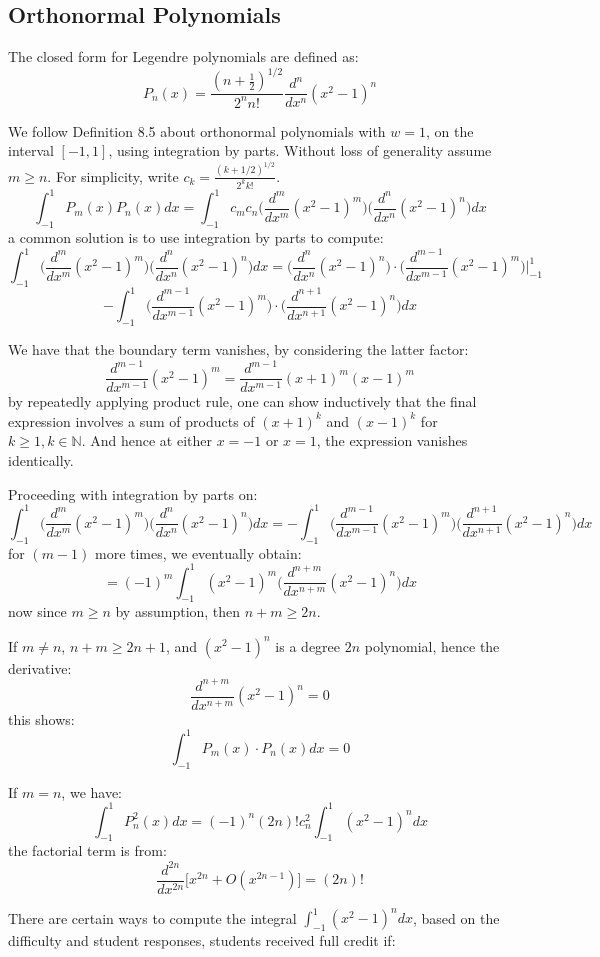 \documentclass[12pt]{article} %
\newcommand{\nn}{\mathbb{N}}
\newcommand{\1}[1]{\mathds{1}\left[#1\right]}
\begin{document}
\newpage
\subsection{Orthonormal Polynomials}
The closed form for Legendre polynomials are defined as:
$$
	P_n(x) = \frac{(n+\frac12)^{1/2}}{2^nn!}\frac{d^n}{dx^n}(x^2-1)^n
$$

We follow Definition 8.5 about orthonormal polynomials with $w = 1$, on the interval $[-1,1]$, using integration by parts. Without loss of generality assume $m\ge n$. For simplicity, write $c_k = \frac{(k+1/2)^{1/2}}{2^kk!}$.
$$
	\int_{-1}^1P_m(x)P_n(x)dx = \int_{-1}^1 c_mc_n\bigg(\frac{d^m}{dx^m}(x^2-1)^m\bigg)\bigg(\frac{d^n}{dx^n}(x^2-1)^n\bigg)dx
$$ a common solution is to use integration by parts to compute:
$$
	\int_{-1}^1\bigg(
	\frac{d^m}{dx^m}(x^2-1)^m
	\bigg)
	\bigg(
	\frac{d^n}{dx^n}(x^2-1)^n
	\bigg)dx = \bigg(
	\frac{d^n}{dx^n}(x^2-1)^n
	\bigg)\cdot \bigg(
	\frac{d^{m-1}}{dx^{m-1}}(x^2-1)^m
	\bigg)\bigg|_{-1}^1 
$$
$$
	- \int_{-1}^1\bigg(
	\frac{d^{m-1}}{dx^{m-1}}(x^2-1)^m
	\bigg) \cdot \bigg(
	\frac{d^{n+1}}{dx^{n+1}}(x^2-1)^n
	\bigg) dx
$$

We have that the boundary term vanishes, by considering the latter factor:
$$
	\frac{d^{m-1}}{dx^{m-1}}(x^2-1)^m = \frac{d^{m-1}}{dx^{m-1}}(x+1)^m(x-1)^m
$$ by repeatedly applying product rule, one can show inductively that the final expression involves a sum of products of $(x+1)^k$ and $(x-1)^k$ for $k\ge 1, k\in \nn$. And hence at either $x=-1$ or $x=1$, the expression vanishes identically.

Proceeding with integration by parts on:
$$
	\int_{-1}^1\bigg(
	\frac{d^m}{dx^m}(x^2-1)^m
	\bigg)
	\bigg(
	\frac{d^n}{dx^n}(x^2-1)^n
	\bigg)dx = -\int_{-1}^1\bigg(
	\frac{d^{m-1}}{dx^{m-1}}(x^2-1)^m
	\bigg)\bigg(
	\frac{d^{n+1}}{dx^{n+1}}(x^2-1)^n
	\bigg) dx
$$ for $(m-1)$ more times, we eventually obtain:
$$
	= (-1)^m\int_{-1}^1 (x^2-1)^m \bigg(
	\frac{d^{n+m}}{dx^{n+m}}(x^2-1)^n
	\bigg)dx
$$ now since $m\ge n$ by assumption, then $n+m\ge 2n$.

If $m\neq n$, $n+m\ge 2n+1$, and $(x^2-1)^n$ is a degree $2n$ polynomial, hence the derivative:
$$
	\frac{d^{n+m}}{dx^{n+m}}(x^2-1)^n= 0
$$ this shows:
$$
	\int_{-1}^1P_m(x)\cdot P_n(x)dx = 0
$$

If $m=n$, we have:
$$
	\int_{-1}^1P_n^2(x)dx = (-1)^n(2n)!c_n^2\int_{-1}^1(x^2-1)^ndx
$$ the factorial term is from:
$$
	\frac{d^{2n}}{dx^{2n}}\big[x^{2n}+O(x^{2n-1})\big] = (2n)!
$$

There are certain ways to compute the integral $\int_{-1}^1(x^2-1)^ndx$, based on the difficulty and student responses, students received full credit if:
\end{document}
